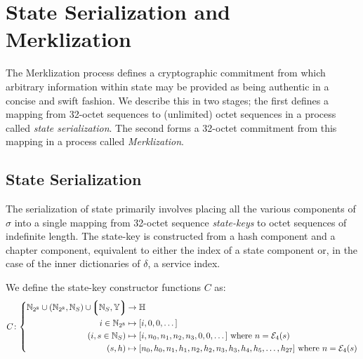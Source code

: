 \section{State Serialization and Merklization}\label{sec:statemerklization}

The Merklization process defines a cryptographic commitment from which arbitrary information within state may be provided as being authentic in a concise and swift fashion. We describe this in two stages; the first defines a mapping from 32-octet sequences to (unlimited) octet sequences in a process called \emph{state serialization}. The second forms a 32-octet commitment from this mapping in a process called \emph{Merklization}.

\subsection{State Serialization}

The serialization of state primarily involves placing all the various components of $\sigma$ into a single mapping from 32-octet sequence \emph{state-keys} to octet sequences of indefinite length. The state-key is constructed from a hash component and a chapter component, equivalent to either the index of a state component or, in the case of the inner dictionaries of $\delta$, a service index.

We define the state-key constructor functions $C$ as:
\begin{equation}
  C\colon\left\{\begin{aligned}
    \N_{2^8} \cup (\N_{2^8}, \N_S) \cup \tup{\N_S, \Y} &\to \H \\
    i \in \N_{2^8} &\mapsto [i, 0, 0, \dots] \\
    (i, s \in \N_S) &\mapsto [i, n_0, n_1, n_2, n_3, 0, 0, \dots]\ \where n = \se_4(s) \\
    (s, h) &\mapsto [n_0, h_0, n_1, h_1, n_2, h_2, n_3, h_3, h_4, h_5, \dots, h_{27}]\ \where n = \se_4(s)
  \end{aligned}
  \right.
\end{equation}

